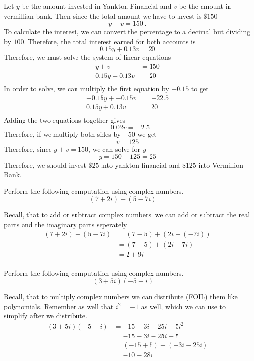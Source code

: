 \documentclass[addpoints,12pt]{exam}
\begin{document}
\begin{questions}
\begin{solution}
    Let $y$ be the amount invested in Yankton Financial and $v$ be the amount in vermillian bank. Then since the total amount we have to invest is $\$150$ 
		\[
		y+v = 150~. 
		\]
		To calculate the interest, we can convert the percentage to a decimal but dividing by $100$. Therefore, the total interest earned for both accounts is 
		\[
		0.15 y + 0.13 v = 20 
		\]
		Therefore, we must solve the system of linear equations 
		\begin{align*}
			y+v & = 150 \\
			0.15 y + 0.13 v & = 20 \\
		\end{align*}
		In order to solve, we can multiply the first equation by $-0.15$ to get 
			\begin{align*}
			-0.15y+-0.15v & = -22.5 \\
			0.15 y + 0.13 v & = 20 \\
		\end{align*}
		Adding the two equations together gives 
		\[
			-0.02 v  = -2.5
		\]
		Therefore, if we multiply both sides by $-50$ we get 
		\[
		v = 125
		\]
		Therefore, since $y+v = 150$, we can solve for $y$ 
		\[
		y = 150 - 125 = 25
		\]
		Therefore, we should invest $\$25$ into yankton financial and $\$ 125$ into Vermillion Bank. 
\end{solution}

\question Perform the following computation using complex numbers. 
   \[
		 (7+2i)-(5-7i)= 
\]

\begin{solution}
	Recall, that to add or subtract complex numbers, we can add or subtract the real parts and the imaginary parts seperately
    \begin{align*}
			(7+2i) - (5-7i) & = (7-5) + (2i - (-7i)) \\
			 & = (7-5) + (2i +7i)\\
			 & = 2 + 9i \\
    \end{align*}
\end{solution}



\question Perform the following computation using complex numbers. 
\[
		 (3+5i)(-5-i)=
\]
\begin{solution}
    Recall, that to multiply complex numbers we can distribute (FOIL) them like polynomials. Remember as well that $i^2 = -1$ as well, which we can use to simplify after we distribute. 
\begin{align*}
    (3+5i)(-5-i) & = -15 -3i -25i -5i^{2}\\
		 & =  -15 - 3i - 25i +5 \\
		 & = (-15+5) + (-3i-25i) \\
		 & = -10 -28 i \\
\end{align*}
\end{solution}


\end{questions}
\end{document}
